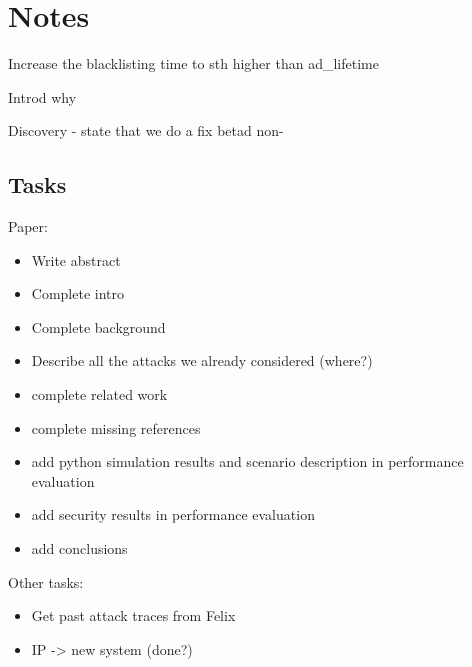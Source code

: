 
\section{Notes}
Increase the blacklisting time to sth higher than ad\_lifetime

Introd why


Discovery - state that we do a fix betad non-


\subsection{Tasks}
Paper: 

\begin{itemize}
	\item Write abstract
    \item Complete intro
    \item Complete background
    \item Describe all the attacks we already considered (where?)
    \item complete related work
    \item complete missing references
    \item add python simulation results and scenario description in performance evaluation
    \item add security results  in performance evaluation
    \item add conclusions
\end{itemize}

Other tasks:

\begin{itemize}
	\item Get past attack traces from Felix
    \item IP -> new system (done?)
\end{itemize}